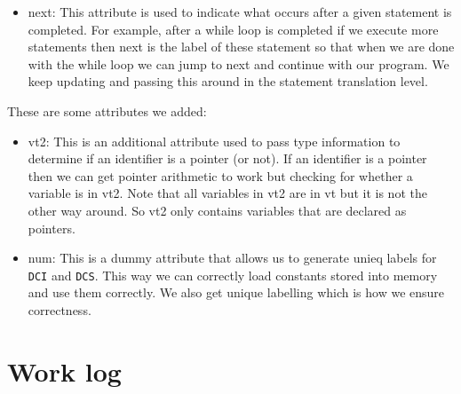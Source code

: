 \documentclass{article}
\begin{document}
\begin{itemize}
    \item next: This attribute is used to indicate what occurs after a given statement is completed. For example, after a while loop is completed if we execute more statements then next is the label of these statement so that when we are done with the while loop we can jump to next and continue with our program. We keep updating and passing this around in the statement translation level.
\end{itemize}
These are some attributes we added:
\begin{itemize}
    \item vt2: This is an additional attribute used to pass type information to determine if an identifier is a pointer (or not). If an identifier is a pointer then we can get pointer arithmetic to work but checking for whether a variable is in vt2. Note that all variables in vt2 are in vt but it is not the other way around. So vt2 only contains variables that are declared as pointers.
    \item num: This is a dummy attribute that allows us to generate unieq labels for \texttt{DCI} and \texttt{DCS}. This way we can correctly load constants stored into memory and use them correctly. We also get unique labelling which is how we ensure correctness.
\end{itemize}

\section{Work log}
\end{document}
